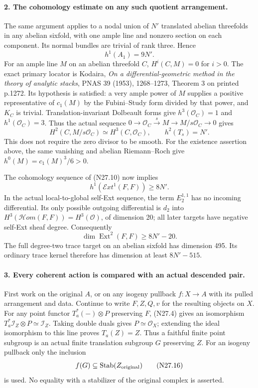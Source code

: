 \paragraph{2. The cohomology estimate on any such quotient arrangement.}
The same argument applies to a nodal union of $N'$ translated
abelian threefolds in any abelian sixfold, with one ample
line and nonzero section on each component. Its normal
bundles are trivial of rank three. Hence
\[
                         h^1(A_1)=9N'.                    \tag{N27.12}
\]
For an ample line $M$ on an abelian threefold $C$,
$H^i(C,M)=0$ for $i>0$. The exact primary locator is
Kodaira, \emph{On a differential-geometric method in the
theory of analytic stacks}, PNAS 39 (1953), 1268--1273,
Theorem 3 on printed p.1272. Its hypothesis is satisfied:
a very ample power of $M$ supplies a positive representative
of $c_1(M)$ by the Fubini--Study form divided by that power,
and $K_C$ is trivial. Translation-invariant Dolbeault forms
give $h^3(\mathcal O_C)=1$ and $h^1(\mathcal O_C)=3$.
Thus the actual sequence
$0\to\mathcal O_C\xrightarrow{s}M\to M/s\mathcal O_C\to0$
gives
\[
                H^2(C,M/s\mathcal O_C)
                     \simeq H^3(C,\mathcal O_C),
                   \qquad h^2(T_s)=N'.                   \tag{N27.13}
\]
This does not require the zero divisor to be smooth.
For the existence assertion above, the same vanishing and
abelian Riemann--Roch give
$h^0(M)=c_1(M)^3/6>0$.

The cohomology sequence of (N27.10) now implies
\[
                 h^1(\mathcal E xt^1(F,F))\ge8N'.         \tag{N27.14}
\]
In the actual local-to-global self-Ext sequence, the term
$E_2^{1,1}$ has no incoming differential. Its only possible
outgoing differential is $d_2$ into
$H^3(\mathcal H om(F,F))=H^3(\mathcal O)$, of dimension 20;
all later targets have negative self-Ext sheaf degree.
Consequently
\[
                        \dim\operatorname{Ext}^2(F,F)
                                             \ge8N'-20.
                                                               \tag{N27.15}
\]
The full degree-two trace target on an abelian sixfold has
dimension 495. Its ordinary trace kernel therefore has
dimension at least $8N'-515$.

\paragraph{3. Every coherent action is compared with an actual descended pair.}
First work on the original $A$, or on any isogeny pullback
$f:X\to A$ with its pulled arrangement and data. Continue
to write $F,Z,Q,v$ for the resulting objects on $X$.
For any point functor $T_a^*(-)\otimes P$ preserving $F$,
(N27.4) gives an isomorphism
$T_a^*\mathcal I_Z\otimes P\simeq\mathcal I_Z$.
Taking double duals gives $P\simeq\mathcal O_X$; extending
the ideal isomorphism to this line proves $T_a(Z)=Z$.
Thus a faithful finite point subgroup is an actual finite
translation subgroup $G$ preserving $Z$. For an isogeny
pullback only the inclusion
\[
                            f(G)\subseteq\operatorname{Stab}(Z_{\rm original})
                                                               \tag{N27.16}
\]
is used. No equality with a stabilizer of the original
complex is asserted.

